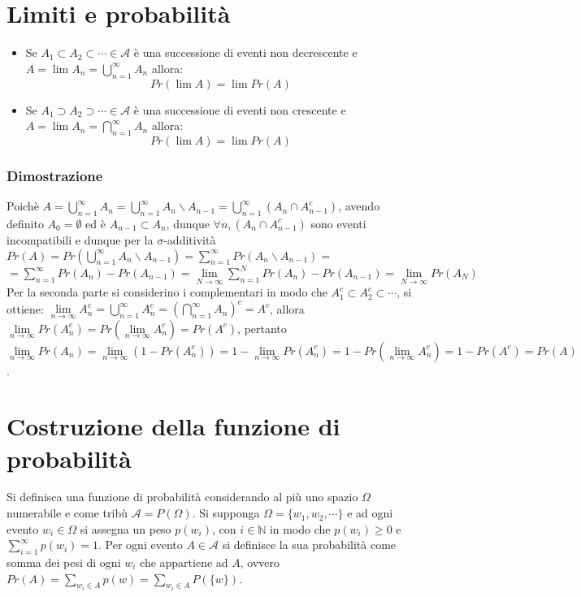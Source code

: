 \section{Limiti e probabilit\`a}
\begin{itemize}
\item Se $A_1\subset A_2\subset\cdots\in\mathcal{A}$ \`e una successione di eventi non decrescente e $A=\lim A_n=\bigcup_{n=1}^\infty A_n$ allora:
\begin{equation}
Pr(\lim A)=\lim Pr(A)
\end{equation}
\item Se $A_1\supset A_2\supset\cdots\in\mathcal{A}$ \`e una successione di eventi non crescente e $A=\lim A_n=\bigcap_{n=1}^\infty A_n$ allora:
\begin{equation}
Pr(\lim A)=\lim Pr(A)
\end{equation}
\end{itemize}
\subsubsection{Dimostrazione}
Poich\`e $A=\bigcup\limits_{n=1}^\infty A_n=\bigcup\limits_{n=1}^\infty A_n\backslash A_{n-1}=\bigcup\limits_{n=1}^\infty (A_n\cap A^c_{n-1})$, avendo 
definito $A_0=\emptyset$ ed \`e $A_{n-1}\subset A_n$, dunque $\forall n, (A_n\cap A^c_{n-1})$ sono eventi incompatibili e dunque per la 
$\sigma$-additivit\`a $Pr(A)=Pr(\bigcup\limits_{n=1}^\infty A_n\backslash A_{n-1})=\sum\limits_{n=1}^\infty Pr(A_n\backslash A_{n-1})=$\\
$=\sum\limits_{n=1}^\infty Pr(A_n)-Pr(A_{n-1})=\lim\limits_{N\rightarrow\infty}\sum\limits_{n=1}^NPr(A_n)-Pr(A_{n-1})=\lim\limits_{N\rightarrow\infty}
Pr(A_N)$\\
Per la seconda parte si considerino i complementari in modo che $A_1^c\subset A_2^c\subset\cdots$, si ottiene: $\lim\limits_{n\rightarrow\infty}A_n^c=
\bigcup\limits_{n=1}^\infty A_n^c=(\bigcap\limits_{n=1}^\infty A_n)^c=A^c$, allora $\lim\limits_{n\rightarrow\infty}Pr(A_n^c)=Pr(\lim\limits_{n\rightarrow
\infty}A_n^c)=Pr(A^c)$, pertanto $\lim\limits_{n\rightarrow\infty}Pr(A_n)=\lim\limits_{n\rightarrow\infty}(1-Pr(A_n^c))=1- \lim\limits_{n\rightarrow
\infty}Pr(A_n^c)=1-Pr(\lim\limits_{n\rightarrow\infty}A_n^c)=1-Pr(A^c)=Pr(A)$.
\section{Costruzione della funzione di probabilit\`a}
Si definisca una funzione di probabilit\`a considerando al pi\`u uno spazio $\Omega$ numerabile e come trib\`u $\mathcal{A}=P(\Omega)$. Si supponga $
\Omega=\{w_1,w_2,\cdots\}$ e ad ogni evento $w_i\in\Omega$ si assegna un peso $p(w_i)$, con $i\in\mathbb{N}$ in modo che $p(w_i)\ge0$ e $\sum\limits_{i=1}^
\infty p(w_i)=1$. Per ogni evento $A\in\mathcal{A}$ si definisce la sua probabilit\`a come somma dei pesi di ogni $w_i$ che appartiene ad $A$, ovvero
$Pr(A)=\sum\limits_{w_i\in A}p(w)=\sum\limits_{w_i\in A}P(\{w\})$.

